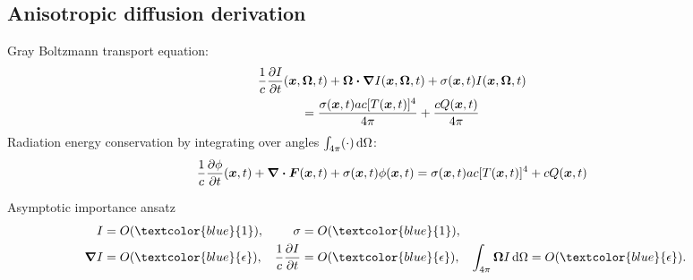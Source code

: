 \documentclass{beamer}
\newcommand{\epsiloncolor}[1]{\textcolor{blue}{#1}}
\begin{document}
\subsection{Anisotropic diffusion derivation}
\begin{frame}
  Gray Boltzmann transport equation:
  \begin{multline} \label{eq:fullGrayTransport2}
  \frac{1}{c} \frac{\partial I}{\partial t}(\bm{x}, \bm{\Omega}, t)
  + \bm{\Omega} \bm{\cdot} \bm{\nabla} I(\bm{x}, \bm{\Omega}, t) +
 \sigma(\bm{x}, t) I(\bm{x}, \bm{\Omega}, t)
  \\= \frac{\sigma(\bm{x}, t) a c [T(\bm{x},t)]^4}{4\pi} 
  + \frac{c Q(\bm{x},t)}{4\pi}
  \end{multline}
  Radiation energy conservation by integrating over angles $\int_{4\pi} (\cdot) \mathop{}\!\mathrm{d}
  \Omega$:
  \begin{equation} \label{eq:grayTransportZeroth}
  \frac{1}{c} \frac{\partial \phi}{\partial t}(\bm{x}, t)
  +\bm{\nabla} \bm{\cdot} \bm{F}(\bm{x}, t) +
 \sigma(\bm{x}, t) \phi(\bm{x}, t)
  = \sigma(\bm{x}, t) a c [T(\bm{x},t)]^4
  + c Q(\bm{x},t)
  \end{equation}

  \begin{block}{Asymptotic importance ansatz}
    \begin{align*}
  I &= O(\epsiloncolor{1}), &
  \sigma &= O(\epsiloncolor{1}), \\
  \del I &= O(\epsiloncolor{\epsilon}), &
  \frac1c\pder{I}{t} &= O(\epsiloncolor{\epsilon}), &
  \int_{4\pi} \vec{\Omega} I\ud \Omega &= O(\epsiloncolor{\epsilon}).
    \end{align*}
  \end{block}
\end{frame}
\end{document}
